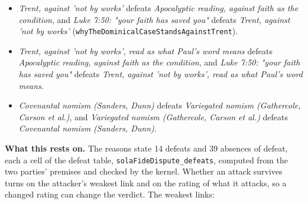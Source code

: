 \documentclass[11pt]{article}
\begin{document}
\begin{itemize}
\begin{itemize}
\item \emph{Trent, against 'not by works'} defeats \emph{Apocalyptic reading, against faith as the condition}, and \emph{Luke 7:50: "your faith has saved you"} defeats \emph{Trent, against 'not by works'} (\texttt{why\allowbreak{}The\allowbreak{}Dominical\allowbreak{}Case\allowbreak{}Stands\allowbreak{}Against\allowbreak{}Trent}).
\item \emph{Trent, against 'not by works', read as what Paul's word means} defeats \emph{Apocalyptic reading, against faith as the condition}, and \emph{Luke 7:50: "your faith has saved you"} defeats \emph{Trent, against 'not by works', read as what Paul's word means}.
\item \emph{Covenantal nomism (Sanders, Dunn)} defeats \emph{Variegated nomism (Gathercole, Carson et al.)}, and \emph{Variegated nomism (Gathercole, Carson et al.)} defeats \emph{Covenantal nomism (Sanders, Dunn)}.
\end{itemize}
\end{itemize}
\par\noindent\textbf{What this rests on.} The reasons state 14 defeats and 39 absences of defeat, each a cell of the defeat table, \texttt{sola\allowbreak{}Fide\allowbreak{}Dispute\_\allowbreak{}defeats}, computed from the two parties' premises and checked by the kernel. Whether an attack survives turns on the attacker's weakest link and on the rating of what it attacks, so a changed rating can change the verdict. The weakest links:
\end{document}
